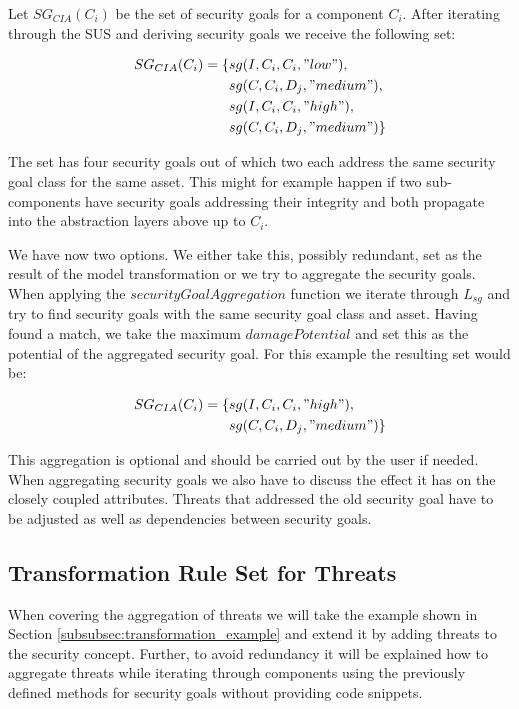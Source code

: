 Let $SG_{CIA}(C_i)$ be the set of security goals for a component $C_i$. After iterating through the SUS and deriving security goals we receive the following set:

\begin{align*}
SG_{CIA}(C_i) = \{&sg(I,C_i,C_i,"low"),\\ &sg(C,C_i,D_j, "medium"),\\ &sg(I,C_i,C_i,"high"),\\ &sg(C,C_i,D_j, "medium")\} \\
\end{align*}

The set has four security goals out of which two each address the same security goal class for the same asset. This might for example happen if two sub-components have security goals addressing their integrity and both propagate into the abstraction layers above up to $C_i$. 

We have now two options. We either take this, possibly redundant, set as the result of the model transformation or we try to aggregate the security goals. When applying the $securityGoalAggregation$ function we iterate through $L_{sg}$ and try to find security goals with the same security goal class and  asset. Having found a match, we take the maximum $damagePotential$ and set this as the potential of the aggregated security goal. For this example the resulting set would be:

\begin{align*}
SG_{CIA}(C_i) = \{&sg(I,C_i,C_i,"high"),\\ &sg(C,C_i,D_j, "medium")\} \\
\end{align*}

This aggregation is optional and should be carried out by the user if needed. When aggregating security goals we also have to discuss the effect it has on the closely coupled attributes. Threats that addressed the old security goal have to be adjusted as well as dependencies between security goals. 
   
\subsection{Transformation Rule Set for Threats}
\label{subsec:threat_rules}

When covering the aggregation of threats we will take the example shown in Section \ref{subsubsec:transformation_example} and extend it by adding threats to the security concept. Further, to avoid redundancy it will be explained how to aggregate threats while iterating through components using the previously defined methods for security goals without providing code snippets. 

